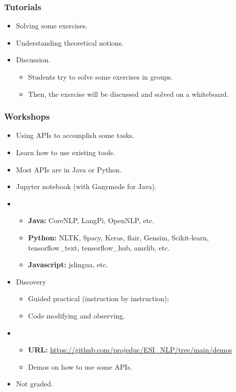\documentclass{beamer}
\begin{document}
\begin{frame}
	\frametitle{Tutorials}
	
	\begin{itemize}
		\item Solving some exercises.
		\item {} Understanding theoretical notions.
		\item {} Discussion.
		\begin{itemize}
			\item Students try to solve some exercises in groups.
			\item Then, the exercise will be discussed and solved on a whiteboard.
		\end{itemize}
	\end{itemize}
	
\end{frame}

\begin{frame}
	\frametitle{Workshops}
	
	\begin{itemize}
		\item Using APIs to accomplish some tasks.
		\item {} Learn how to use existing tools.
		\item {} Most APIs are in Java or Python.
		\item {} Jupyter notebook (with Ganymede for Java).
		\item {} 
		\begin{itemize}
			\item \textbf{Java:} CoreNLP, LangPi, OpenNLP, etc.
			\item \textbf{Python:} NLTK, Spacy, Keras, flair, Gensim, Scikit-learn, tensorflow\_text, tensorflow\_hub, amrlib, etc.
			\item \textbf{Javascript:} jslingua, etc.
		\end{itemize}
		\item {} Discovery
		\begin{itemize}
			\item Guided practical (instruction by instruction); 
			\item Code modifying and observing.
		\end{itemize}
		\item {}
		\begin{itemize}
			\item \textbf{URL:} {\scriptsize\url{https://github.com/projeduc/ESI_NLP/tree/main/demos}}
			\item Demos on how to use some APIs.
		\end{itemize}
		\item Not graded.
	\end{itemize}
	
\end{frame}
\end{document}
